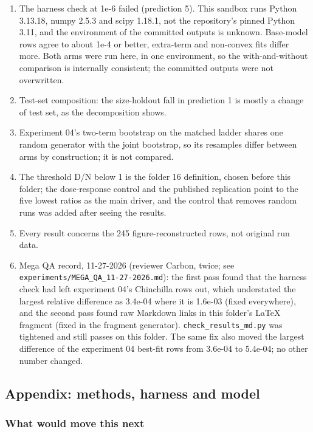 \begin{enumerate}
  \item The harness check at 1e-6 failed (prediction 5). This sandbox runs Python 3.13.18, numpy 2.5.3 and scipy 1.18.1, not the repository's pinned Python 3.11, and the environment of the committed outputs is unknown. Base-model rows agree to about 1e-4 or better, extra-term and non-convex fits differ more. Both arms were run here, in one environment, so the with-and-without comparison is internally consistent; the committed outputs were not overwritten.
  \item Test-set composition: the size-holdout fall in prediction 1 is mostly a change of test set, as the decomposition shows.
  \item Experiment 04's two-term bootstrap on the matched ladder shares one random generator with the joint bootstrap, so its resamples differ between arms by construction; it is not compared.
  \item The threshold D/N below 1 is the folder 16 definition, chosen before this folder; the dose-response control and the published replication point to the five lowest ratios as the main driver, and the control that removes random runs was added after seeing the results.
  \item Every result concerns the 245 figure-reconstructed rows, not original run data.
  \item Mega QA record, 11-27-2026 (reviewer Carbon, twice; see \texttt{experiments/\allowbreak{}MEGA\_\allowbreak{}QA\_\allowbreak{}11-27-2026.md}): the first pass found that the harness check had left experiment 04's Chinchilla rows out, which understated the largest relative difference as 3.4e-04 where it is 1.6e-03 (fixed everywhere), and the second pass found raw Markdown links in this folder's LaTeX fragment (fixed in the fragment generator). \texttt{check\_\allowbreak{}results\_\allowbreak{}md.py} was tightened and still passes on this folder. The same fix also moved the largest difference of the experiment 04 best-fit rows from 3.6e-04 to 5.4e-04; no other number changed.
\end{enumerate}


\subsection*{Appendix: methods, harness and model}
\subsubsection*{What would move this next}

